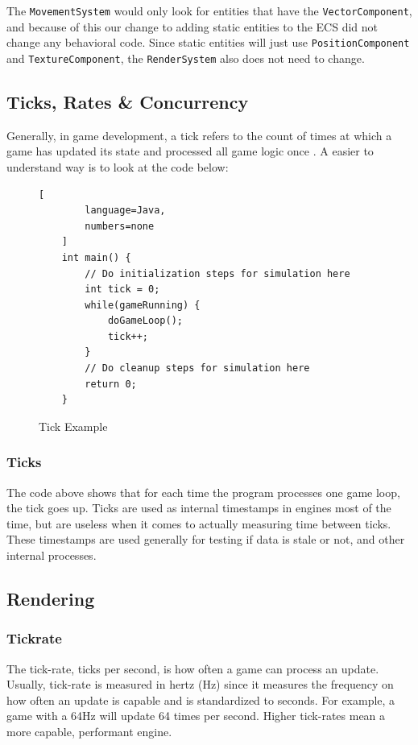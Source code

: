 The \texttt{MovementSystem} would only look for entities that have the \texttt{VectorComponent}, and because of this our change to adding static entities to the ECS did not change any behavioral code. Since static entities will just use \texttt{PositionComponent} and \texttt{TextureComponent}, the \texttt{RenderSystem} also does not need to change.

\subsection{Ticks, Rates \& Concurrency}
Generally, in game development, a tick refers to the count of times at which a game has updated its state and processed all game logic once \cite{Gregory_2018}. A easier to understand way is to look at the code below: 

\begin{figure}[H]
    \begin{lstlisting}[
        language=Java,
        numbers=none
    ]
    int main() {
        // Do initialization steps for simulation here
        int tick = 0;
        while(gameRunning) {
            doGameLoop();
            tick++;
        }
        // Do cleanup steps for simulation here
        return 0;
    }
\end{lstlisting}
    \caption{Tick Example}
    \label{code:naive_ecs_data}
\end{figure}

\subsubsection{Ticks}

The code above shows that for each time the program processes one game loop, the tick goes up. Ticks are used as internal timestamps in engines most of the time, but are useless when it comes to actually measuring time between ticks. These timestamps are used generally for testing if data is stale or not, and other internal processes. 

\subsection{Rendering}

\subsubsection{Tickrate}

The tick-rate, ticks per second, is how often a game can process an update. Usually, tick-rate is measured in hertz (Hz) since it measures the frequency on how often an update is capable and is standardized to seconds\cite{Gregory_2018}. For example, a game with a 64Hz will update 64 times per second. Higher tick-rates mean a more capable, performant engine.

